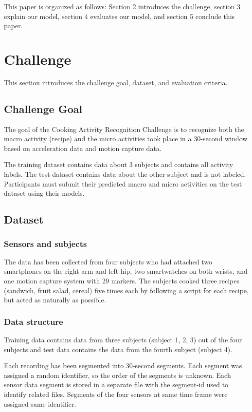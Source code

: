 \documentclass{svmult}
\begin{document}
This paper is organized as follows: Section 2 introduces the challenge, section 3 explain our model, section 4 evaluates our model, and section 5 conclude this paper.

\section{Challenge}
\label{sec:challenge}
This section introduces the challenge goal, dataset, and evaluation criteria.

\subsection{Challenge Goal}
The goal of the Cooking Activity Recognition Challenge is to recognize both the macro activity (recipe) and the micro activities took place in a 30-second window based on acceleration data and motion capture data.

The training dataset contains data about 3 subjects and contains all activity labels. The test dataset contains data about the other subject and is not labeled. Participants must submit their predicted macro and micro activities on the test dataset using their models.

\subsection{Dataset}
\label{sec:dataset}
\subsubsection{Sensors and subjects}
The data has been collected from four subjects who had attached two smartphones on the right arm and left hip, two smartwatches on both wrists, and one motion capture system with 29 markers. The subjects cooked three recipes (sandwich, fruit salad, cereal) five times each by following a script for each recipe, but acted as naturally as possible.

\subsubsection{Data structure}
Training data contains data from three subjects (subject 1, 2, 3) out of the four subjects and test data contains the data from the fourth subject (subject 4).

Each recording has been segmented into 30-second segments. Each segment was assigned a random identifier, so the order of the segments is unknown. Each sensor data segment is stored in a separate file with the segment-id used to identify related files. Segments of the four sensors at same time frame were assigned same identifier. 
\end{document}
